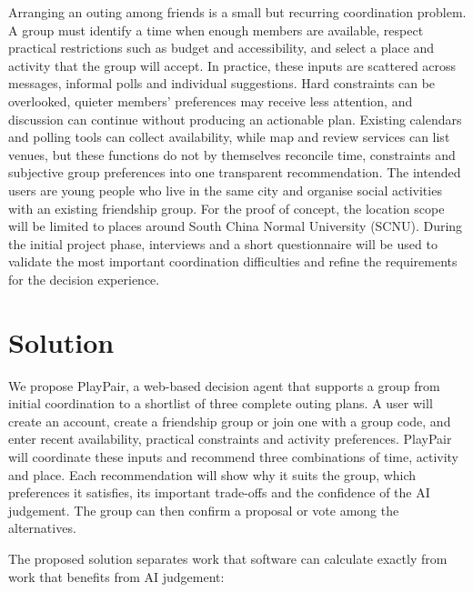\documentclass[12pt,a4paper]{article}
\begin{document}
Arranging an outing among friends is a small but recurring coordination problem. A group must identify a time when enough members are available, respect practical restrictions such as budget and accessibility, and select a place and activity that the group will accept. In practice, these inputs are scattered across messages, informal polls and individual suggestions. Hard constraints can be overlooked, quieter members' preferences may receive less attention, and discussion can continue without producing an actionable plan. Existing calendars and polling tools can collect availability, while map and review services can list venues, but these functions do not by themselves reconcile time, constraints and subjective group preferences into one transparent recommendation. The intended users are young people who live in the same city and organise social activities with an existing friendship group. For the proof of concept, the location scope will be limited to places around South China Normal University (SCNU). During the initial project phase, interviews and a short questionnaire will be used to validate the most important coordination difficulties and refine the requirements for the decision experience.

\section*{Solution}

We propose PlayPair, a web-based decision agent that supports a group from initial coordination to a shortlist of three complete outing plans. A user will create an account, create a friendship group or join one with a group code, and enter recent availability, practical constraints and activity preferences. PlayPair will coordinate these inputs and recommend three combinations of time, activity and place. Each recommendation will show why it suits the group, which preferences it satisfies, its important trade-offs and the confidence of the AI judgement. The group can then confirm a proposal or vote among the alternatives.

The proposed solution separates work that software can calculate exactly from work that benefits from AI judgement:
\end{document}
